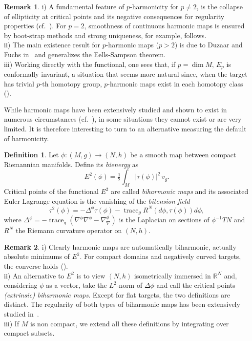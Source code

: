 \documentclass[12pt]{amsart}
\theoremstyle{plain}
\theoremstyle{definition}
\newtheorem{de}{Definition}
\newtheorem{rk}{Remark}
\begin{document}
\begin{rk}
i) A fundamental feature of $p$-harmonicity for $p\neq 2$, is the collapse of
ellipticity at critical points and its negative consequences for regularity
properties (cf.~\cite{H-L}). For $p=2$, smoothness of continuous
harmonic maps is ensured by boot-strap methods and strong uniqueness, for example, follows.\\
ii) The main existence result for $p$-harmonic maps ($p>2$) is due to Duzaar and
Fuchs in~\cite{D-F} and generalizes the Eells-Sampson theorem.\\
iii) Working directly with the functional, one sees that, if $p=\dim{M}$, $E_{p}$ is
conformally invariant, a situation that seems more natural since, when the target
has trivial $p$-th homotopy group,
 $p$-harmonic maps exist in each homotopy class (\cite{Jost}).
\end{rk}

While harmonic maps have been extensively studied and shown to exist in numerous
circumstances (cf.~\cite{E-L}), in some situations they cannot exist or are very
limited. It is therefore interesting to turn to an alternative measuring the default
of harmonicity.
\begin{de}
Let $\phi : (M,g) \to (N,h)$ be a smooth map between compact Riemannian manifolds.
Define its {\em bienergy} as
$$ E^{2}(\phi) = \tfrac{1}{2} \int_{M} | \tau(\phi) |^{2} \, v_{g} .$$
Critical points of the functional $E^{2}$ are called {\em biharmonic maps} and its
associated Euler-Lagrange equation is the vanishing of the {\em bitension field}
$$ \tau^{2}(\phi) = - \Delta^{\phi} \tau(\phi) - \operatorname{trace}_{g}{R^{N}}(
d\phi, \tau(\phi) ) d\phi ,$$ where $\Delta^{\phi} = - \operatorname{trace}_{g} (\nabla^{\phi}\nabla^{\phi} - \nabla^{\phi}_{\nabla})$ is the
Laplacian on sections of $\phi^{-1}TN$ and $R^{N}$ the Riemann curvature operator on
$(N,h)$.
\end{de}

\begin{rk}
i) Clearly harmonic maps are automatically biharmonic, actually absolute minimums of
$E^2$.
For compact domains and negatively curved targets, the converse holds (\cite{Jiang}).\\
ii) An alternative to $E^2$ is to view $(N,h)$ isometrically immersed in ${{\mathbb R}}^N$ and,
considering $\phi$ as a vector, take the $L^2$-norm of $\Delta\phi$ and call the
critical points {\em (extrinsic) biharmonic maps}. Except for flat targets, the two
definitions are distinct.
The regularity of both types of biharmonic maps has been extensively studied in~\cite{C-W-Y,W1,W2,W3}.\\
iii) If $M$ is non compact, we extend all these definitions by integrating over
compact subsets.
\end{rk}
\end{document}
